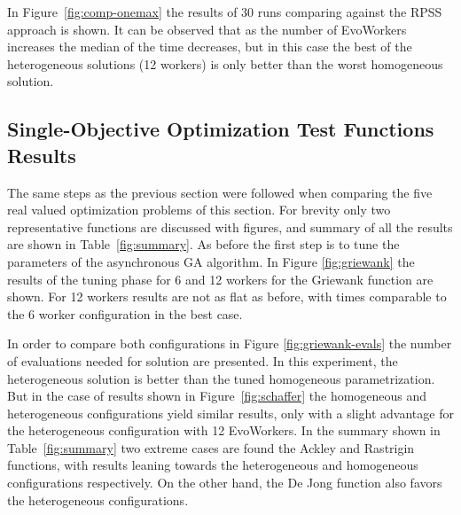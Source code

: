 \documentclass{llncs}
\begin{document}
In Figure~\ref{fig:comp-onemax} the results of 30 runs comparing
against the RPSS approach is shown. %
It can be observed that as the number of EvoWorkers increases the median of the time decreases, but
in this case the best of the heterogeneous solutions (12 workers) is only better than the worst homogeneous
solution.  %

\subsection{Single-Objective Optimization Test Functions Results}

The same steps as the previous section were followed when comparing the five real valued 
optimization problems of this section. For brevity only two representative functions are discussed
with figures, and summary of all the results are shown in Table~\ref{fig:summary}. As before
the first step is to tune the parameters of the 
asynchronous GA algorithm. In Figure \ref{fig:griewank} the results of the tuning 
phase for 6 and 12 workers for the Griewank function are shown. For 12 workers
results are not as flat as before, with times comparable to the 6 worker 
configuration in the best case.

In order to compare both configurations in Figure \ref{fig:griewank-evals} the number of evaluations 
needed for solution are presented. In this experiment, the heterogeneous solution is better than the
tuned homogeneous parametrization. But in the case of results shown in Figure~\ref{fig:schaffer} 
the homogeneous and heterogeneous configurations yield similar results, 
only with a slight advantage
for the heterogeneous configuration with 12 EvoWorkers. In the summary shown in
Table~\ref{fig:summary} two extreme cases are found the Ackley and Rastrigin functions, 
with results leaning
towards the heterogeneous and homogeneous configurations respectively. On the other hand, the De Jong
function also favors the heterogeneous configurations. 
\end{document}
